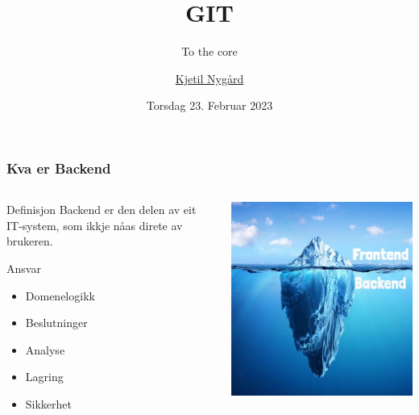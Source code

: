 \documentclass{beamer}
\title{GIT}
\subtitle{To the core}
\author{\href{kjetil.nygard@tietoevry.com}{Kjetil Nygård}}
\institute{TietoEvry}
\date{Torsdag 23. Februar 2023}
\begin{document}
    \frame{\titlepage}


    \begin{frame}
        \frametitle{Kva er Backend}
        \begin{columns}[c]
            \begin{column}{.55\textwidth}
                \begin{block}{Definisjon}
                    Backend er den delen av eit IT-system,
                    som ikkje nåas direte av brukeren.
                \end{block}
                \begin{block}{Ansvar}
                    \begin{itemize}
                        \item Domenelogikk
                        \item Beslutninger
                        \item Analyse
                        \item Lagring
                        \item Sikkerhet
                    \end{itemize}
                \end{block}
            \end{column}
            \begin{column}{.45\textwidth}
                \begin{center}
                    \includegraphics[width=\textwidth]{images/backend-iceberg}
                \end{center}
            \end{column}
        \end{columns}
    \end{frame}
\end{document}
